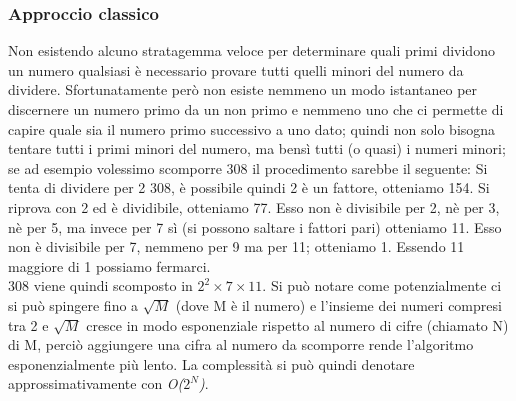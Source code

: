 \subsubsection{Approccio classico}
Non esistendo alcuno stratagemma veloce per determinare quali primi dividono un numero qualsiasi è necessario provare tutti quelli minori del numero da dividere. Sfortunatamente però non esiste nemmeno un modo istantaneo per discernere un numero primo da un non primo e nemmeno uno che ci permette di capire quale sia il numero primo successivo a uno dato; quindi non solo bisogna tentare tutti i primi minori del numero, ma bensì tutti (o quasi) i numeri minori; se ad esempio volessimo scomporre 308 il procedimento sarebbe il seguente:
Si tenta di dividere per 2 308, è possibile quindi 2 è un fattore, otteniamo 154. Si riprova con 2 ed è dividibile, otteniamo 77. Esso non è divisibile per 2, nè per 3, nè per 5, ma invece per 7 sì (si possono saltare i fattori pari) otteniamo 11. Esso non è divisibile per 7, nemmeno per 9 ma per 11; otteniamo 1. Essendo 11 maggiore di 1 possiamo fermarci.\\
308 viene quindi scomposto in $2^2 \times 7 \times 11$. Si può notare come potenzialmente ci si può spingere fino a $\sqrt{M}$ (dove M è il numero) e l'insieme dei numeri compresi tra 2 e $\sqrt{M}$ cresce in modo esponenziale rispetto al numero di cifre (chiamato N) di M, perciò aggiungere una cifra al numero da scomporre rende l'algoritmo esponenzialmente più lento. La complessità si può quindi denotare approssimativamente con \textit{O($2^N$)}.
